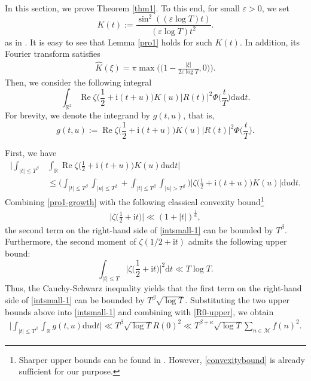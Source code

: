 \documentclass[12pt,reqno]{amsart}
\theoremstyle{definition}
\numberwithin{equation}{section}
\newcommand{\bgg}{\bigg}
\newcommand{\Bg}{\Big}
\newcommand{\Bgl}{\Big(}
\newcommand{\Bgr}{\Big)}
\newcommand{\ph}{\Phi}
\newcommand{\mbr}{\mathbb{R}}
\newcommand{\mcm}{\mathcal{M}}
\newcommand{\mmd}{\mathrm{d}}
\newcommand{\mmi}{\mathrm{i}}
\newcommand{\mit}{\mathrm{i}t}
\newcommand{\re}{\operatorname{Re}}
\begin{document}
In this section, we prove Theorem \ref{thm1}. To this end, for small \(\varepsilon>0\), we set 
\[
K(t) := \frac{\sin^2((\varepsilon \log T)t)}{(\varepsilon \log T)t^2}.
\]
as in \cite{bondarenko2018argument}. It is easy to see that Lemma \ref{pro1} holds for such \(K(t)\). In addition, its Fourier transform satisfies 
\begin{align}
    \label{Kfourier-lower}
    \widehat{K}(\xi) =\pi \max \Bgl \Bgl 1- \frac{|\xi|}{2\varepsilon \log T},0 \Bgr \Bgr.
\end{align}
Then, we consider the following integral
\[
\int_{\mbr^2} \re \zeta\Bgl \frac{1}{2} +\mmi (t+u) \Bgr K(u) |R(t)|^2 \ph \Bgl \frac{t}{T}\Bgr \mmd u\mmd t.
\]
For brevity, we denote the integrand by \(g(t,u)\), that is,
\[
g(t,u) := \re \zeta\Bgl \frac{1}{2} +\mmi (t+u) \Bgr K(u) |R(t)|^2 \ph \Bgl \frac{t}{T}\Bgr.
\]
\par
First, we have
\begin{align}
\label{intsmall-1}
    \bgg|\int_{|t| \le T^\beta} & \int_\mbr \re \zeta\Bgl \frac{1}{2} +\mmi (t+u) \Bgr K(u) \mmd u \mmd t \bgg| \nonumber \\
    &  \le  \Bgl \int_{|t| \le T^\beta}  \int_{|u| \le T^\beta}+ \int_{|t| \le T^\beta}  \int_{|u| > T^\beta} \Bgr \Bg|\zeta\Bgl \frac{1}{2}
    + \mmi (t+u) \Bgr K(u)\Bg|  \mmd u \mmd t. 
\end{align}
Combining \eqref{pro1-growth} with the following classical convexity bound\footnote{Sharper upper bounds can be found in \cite{Bourgain2017JAMS}. However, \eqref{convexitybound} is already sufficient for our purpose.}
\begin{align}
    \label{convexitybound}
\Bg| \zeta\Bgl \frac{1}{2}+\mit \Bgr \Bg| \ll (1+|t|)^\frac{1}{6},
\end{align}
the second term on the right-hand side of \eqref{intsmall-1} can be bounded by \(T^\beta\). Furthermore, the second moment of \(\zeta(1/2+\mit)\) admits the following upper bound:
\[
\int_{|t| \le T} \Bg|\zeta\Bgl \frac{1}{2}+ \mit\Bgr \Bg|^2 \mmd t \ll T \log T.
\]
Thus, the Cauchy-Schwarz inequality yields that the first term on the right-hand side of \eqref{intsmall-1} can be bounded by \(T^\beta \sqrt{\log T}\). Substituting the two upper bounds above into \eqref{intsmall-1} and combining with \eqref{R0-upper}, we obtain
\begin{align}
    \label{intsmallR-1}
    \bgg|\int_{|t| \le T^\beta} \int_\mbr g(t,u) \mmd u \mmd t \bgg| \ll T^\beta \sqrt{\log T} R(0)^2\ll T^{\beta+\kappa}\sqrt{\log T}\sum_{n \in \mcm}f(n)^2.  
\end{align}
\end{document}
